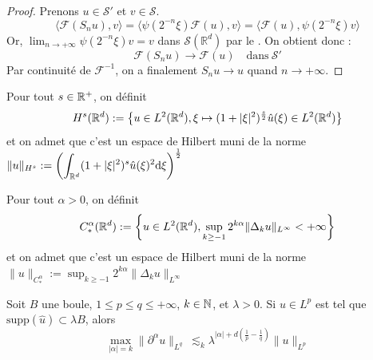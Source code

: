 \documentclass[11pt,a4paper]{article}
\begin{document}
\begin{proof}
Prenons $u \in \mathcal{S}'$ et $v \in \mathcal{S}$.
\[ \langle \mathcal{F}(S_n u), v \rangle = \langle \psi(2^{-n}\xi) \mathcal{F}(u), v \rangle = \langle \mathcal{F}(u), \psi(2^{-n}\xi) v \rangle \]
Or, $\lim_{n \to +\infty} \psi(2^{-n}\xi)v = v$ dans $\mathcal{S}(\mathbb{R}^d)$ par le . On obtient donc :
\[ \mathcal{F}(S_n u) \to \mathcal{F}(u) \quad \text{dans} \ \mathcal{S}' \]
Par continuité de $\mathcal{F}^{-1}$, on a finalement $S_n u \to u$ quand $n \to +\infty$.
\end{proof}
     
     
\begin{defin}
Pour tout $s\in \mathbb R^+$, on définit 
\begin{equation*}
H^s(\mathbb R^d) := \left\{ u\in L^2(\mathbb R^d), \xi \mapsto (1+|\xi|^2)^{\frac{s}{2}}\hat{u}(\xi) \in L^2(\mathbb R^d) \right\}
\end{equation*}
et on admet que c'est un espace de Hilbert muni de la norme $\|u\|_{H^s} := \displaystyle \left(\int_{\mathbb R^d} (1+|\xi|^2)^s\hat{u}(\xi)^2\mathrm{d}\xi \right)^\frac{1}{2}$
\end{defin}


\begin{defin}
Pour tout $\alpha > 0$, on définit 
\begin{equation*}
C^\alpha_*(\mathbb R^d) := \left\{ u\in L^2(\mathbb R^d), \sup_{k \geq -1} 2^{k\alpha}\|\Delta_ku\|_{L^\infty} < +\infty \right\}
\end{equation*}
et on admet que c'est un espace de Hilbert muni de la norme $\|u\|_{C^\alpha_*} :=  \sup_{k \geq -1} 2^{k\alpha}\|\Delta_ku\|_{L^\infty} $
\end{defin}

\begin{lemma}
Soit $B$ une boule, $1\leq p  \leq  q \leq +\infty$, $k\in \mathbb N$, et $\lambda >0$. Si $u\in L^p$ est tel que $\text{supp}(\hat{u})\subset \lambda B$, alors
\begin{equation}\label{bernstein}
\max_{|\alpha|=k}{\| \partial^\alpha u\|_{L^q}} \ \lesssim_k \lambda^{|\alpha| +d \left ( \frac{1}{p}- \frac{1}{q} \right )}\|u\|_{L^p}
\end{equation}
\end{lemma}
\end{document}
